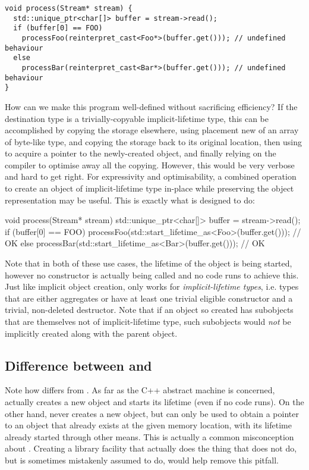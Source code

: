 \begin{lstlisting}
void process(Stream* stream) {
  std::unique_ptr<char[]> buffer = stream->read();
  if (buffer[0] == FOO)
    processFoo(reinterpret_cast<Foo*>(buffer.get())); // undefined behaviour
  else
    processBar(reinterpret_cast<Bar*>(buffer.get())); // undefined behaviour
}
\end{lstlisting}

How can we make this program well-defined without sacrificing efficiency? If the destination type is a trivially-copyable implicit-lifetime type, this can be accomplished by copying the storage elsewhere, using placement new of an array of byte-like type, and copying the storage back to its original location, then using  to acquire a pointer to the newly-created object, and finally relying on the compiler to optimise away all the copying. However, this would be very verbose and hard to get right. For expressivity and optimisability, a combined operation to create an object of implicit-lifetime type in-place while preserving the object representation may be useful. This is exactly what  is designed to do:

\begin{codeblock}
void process(Stream* stream) {
  std::unique_ptr<char[]> buffer = stream->read();
  if (buffer[0] == FOO)
    processFoo(std::start_lifetime_as<Foo>(buffer.get())); // OK
  else
    processBar(std::start_lifetime_as<Bar>(buffer.get())); // OK
}
\end{codeblock}

Note that in both of these use cases, the lifetime of the object is being started, however no constructor is actually being called and no code runs to achieve this. Just like implicit object creation,  only works for \emph{implicit-lifetime types}, i.e. types that are either aggregates or have at least one trivial eligible constructor and a trivial, non-deleted destructor. Note that if an object so created has subobjects that are themselves not of implicit-lifetime type, such subobjects would \emph{not} be implicitly created along with the parent object.

\subsection{Difference between  and }

Note how  differs from . As far as the C++ abstract machine is concerned,  actually creates a new object and starts its lifetime (even if no code runs). On the other hand,  never creates a new object, but can only be used to obtain a pointer to an object that already exists at the given memory location, with its lifetime already started through other means. This is actually a common misconception about . Creating a library facility that actually does the thing that  does not do, but is sometimes mistakenly assumed to do, would help remove this pitfall.


